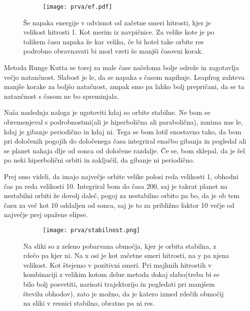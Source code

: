 \documentclass{article}
\begin{document}
\begin{figure}[H]
\centering
\begin{subfigure}{.7\textwidth}
\texttt{[image: prva/ef.pdf]}
\end{subfigure}
\caption*{Še napaka energije v odvisnot od začetne smeri hitrosti, kjer je velikost hitrosti 1. Kot merim iz navpičnice. Za velike kote je po tolikem času napaka že kar velika, če bi hotel take orbite res podrobno obravnavati bi morl vzeti še manjši časovni korak.}
\end{figure}

Metoda Runge Kutta se torej za male čase načeloma bolje odreže in zagotavlja večjo natančnost. Slabost je le, da se napaka s časom napihuje. Leapfrog zahteva manjše korake za boljšo natačnost, ampak smo pa lahko bolj prepričani, da se ta natančnost s časom ne bo spreminjala.


Naša naslednja naloga je ugotoviti kdaj so orbite stabilne. Ne bom se obremenjeval s podrobnostmi(ali je hiperbolična ali parabolična), zanima nas le, kdaj je gibanje periodično in kdaj ni. Tega se bom lotil enostavno tako, da bom pri določenih pogojih do določenega časa integriral enačbo gibanja in pogledal ali se planet nahaja dlje od sonca od določene razdalje. Če se, bom sklepal, da je šel po neki hiperbolični orbiti in zaključil, da gibanje ni periodično.

Prej smo videli, da imajo največje orbite velike polosi reda velikosti 1, obhodni čas pa reda velikosti 10. Integriral bom do časa 200, saj je takrat planet na nestabilni orbiti že dovolj daleč, pogoj za nestabilno orbito pa bo, da je ob tem času za več kot 10 oddaljen od sonca, saj je to za približno faktor 10 večje od največje prej opažene elipse.

\begin{figure}[H]
\centering
\begin{subfigure}{.7\textwidth}
\texttt{[image: prva/stabilnost.png]}
\end{subfigure}
\caption*{Na sliki so z zeleno pobarvana območja, kjer je orbita stabilna, z rdečo pa kjer ni. Na x osi je kot začetne smeri hitrosti, na y pa njena velikost. Kot štejemo v pozitivni smeri. Pri majhnih hitrostih v kombinaciji z velikim kotom delue metoda dokaj slabo(treba bi se bilo bolj posvetiti, narisati trajektorijo in pogledati pri manjšem številu obhodov), zato je možno, da je katero izmed rdečih območij na sliki v resnici stabilno, obratno pa ni res.}
\end{figure}
\end{document}
